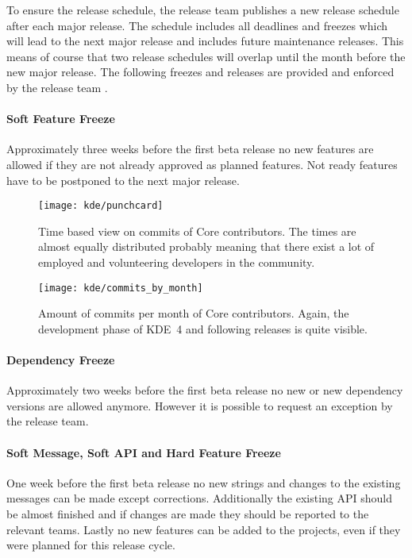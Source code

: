 To ensure the release schedule, the release team publishes a new release
schedule after each major release. The schedule includes all deadlines and
freezes which will lead to the next major release and includes future
maintenance releases. This means of course that two release schedules will
overlap until the month before the new major release. The following freezes and
releases are provided and enforced by the release team
\cite{KDEReleaseSchedule}.

\paragraph{Soft Feature Freeze}

Approximately three weeks before the first beta release no new features are
allowed if they are not already approved as planned features. Not ready
features have to be postponed to the next major release.

\begin{figure}[hbtp]
  \centering
  \texttt{[image: kde/punchcard]}
  \caption{Time based view on commits of Core contributors. The times are
  almost equally distributed probably meaning that there exist a lot of
  employed and volunteering developers in the community.}
\end{figure}

\begin{figure}[htbp]
  \centering
  \texttt{[image: kde/commits\_by\_month]}
  \caption{Amount of commits per month of Core contributors. Again, the
  development phase of KDE~4 and following releases is quite visible.}
\end{figure}

\paragraph{Dependency Freeze}

Approximately two weeks before the first beta release no new or new dependency
versions are allowed anymore. However it is possible to request an exception by
the release team.

\paragraph{Soft Message, Soft API and Hard Feature Freeze}

One week before the first beta release no new strings and changes to the
existing messages can be made except corrections. Additionally the existing API
should be almost finished and if changes are made they should be reported to
the relevant teams. Lastly no new features can be added to the projects, even
if they were planned for this release cycle.

